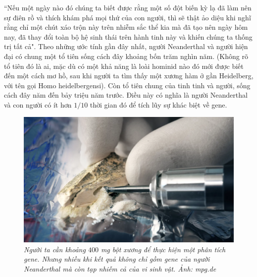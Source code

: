 \begin{multicols}{2}
	\vskip 0.1cm
	``Nếu một ngày nào đó chúng ta biết được rằng một số đột biến kỳ lạ đã làm nên sự điên rồ và thích khám phá mọi thứ của con người, thì sẽ thật ảo diệu khi nghĩ rằng chỉ một chút xáo trộn này trên nhiễm sắc thể kia mà đã tạo nên ngày hôm nay, đã thay đổi toàn bộ hệ sinh thái trên hành tinh này và khiến chúng ta thống trị tất cả".
	\vskip 0.2cm
	\vskip 0.2cm
	Theo những ước tính gần đây nhất, người Neanderthal và người hiện đại có chung một tổ tiên sống cách đây khoảng bốn trăm nghìn năm. (Không rõ tổ tiên đó là ai, mặc dù có một khả năng là loài hominid nào đó mới được biết đến một cách mơ hồ, sau khi người ta tìm thấy một xương hàm ở gần Heidelberg, với tên gọi Homo heidelbergensi). Còn tổ tiên chung của tinh tinh và người, sống cách đây năm đến bảy triệu năm trước. Điều này có nghĩa là người Neanderthal và con người có ít hơn $1/10$ thời gian đó để tích lũy sự khác biệt về gene.
	\begin{figure}[H]
		\vspace*{-5pt}
		\centering
		\captionsetup{labelformat= empty, justification=centering}
		\includegraphics[width= 1\linewidth]{6}
		\caption{\small\textit{\color{timhieukhoahoc}Người ta cần khoảng $400$ mg bột xương để thực hiện một phân tích gene. Nhưng nhiều khi kết quả không chỉ gồm gene của người Neanderthal mà còn tạp nhiễm cả của vi sinh vật. Ảnh: mpg.de}}
		\vspace*{-10pt}
	\end{figure}

\end{multicols}
